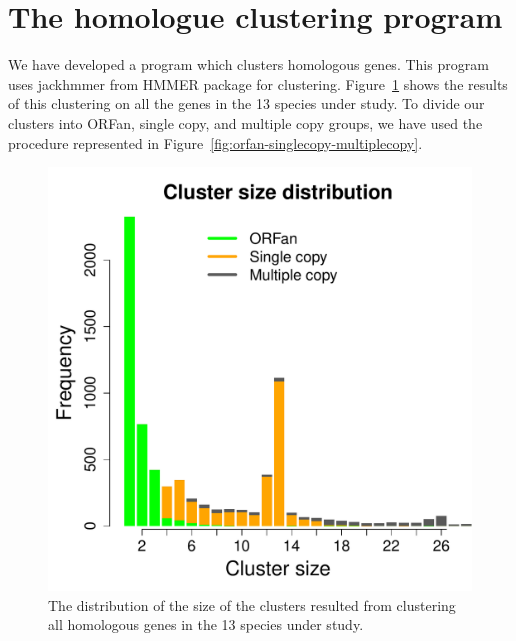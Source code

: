 \documentclass[a4paper,10pt, twocolumn]{article}
\begin{document}
\section{The homologue clustering program}
We have developed a program which clusters homologous genes. This program uses jackhmmer from HMMER package for clustering. Figure~\ref{fig:cluster-size-dist} shows the results of this clustering on all the genes in the 13 species under study. To divide our clusters into ORFan, single copy, and multiple copy groups, we have used the procedure represented in Figure~\ref{fig:orfan-singlecopy-multiplecopy}.

\begin{figure}[H]
\includegraphics[scale=0.40]{cluster-size-dist.pdf}
\caption{The distribution of the size of the clusters resulted from clustering all homologous genes in the 13 species under study.}
\label{fig:cluster-size-dist}
\end{figure}
\end{document}
